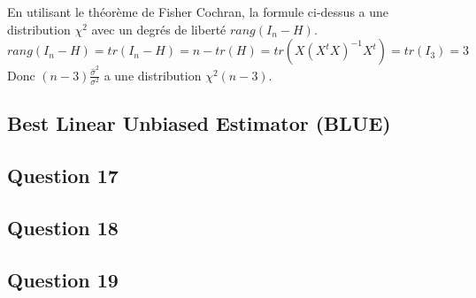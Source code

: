 \documentclass[pdflatex]{article}
\theoremstyle{definition}
\begin{document}
En utilisant le th\'eor\`eme de Fisher Cochran, la formule ci-dessus a une distribution $\chi^2$ avec un degr\'es de libert\'e $rang(I_n-H)$.
$$
rang(I_n - H) = tr(I_n -H) = n - tr(H) = tr(X(X^tX)^{-1}X^t) = tr(I_3) = 3
$$
Donc 
$(n-3)\frac{\hat{\sigma}^2}{\sigma^2}$ a une distribution $\chi^2(n-3)$.


\subsection*{Best Linear Unbiased Estimator (BLUE)}

\subsection*{Question 17}

\subsection*{Question 18}

\subsection*{Question 19}
\end{document}
